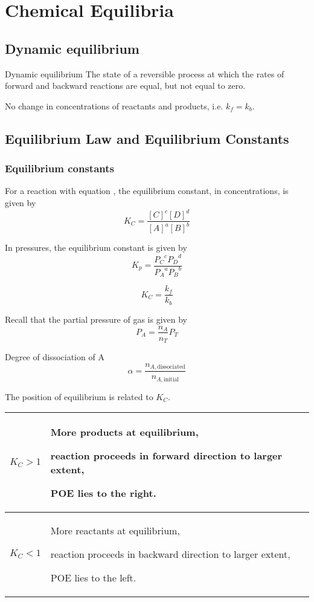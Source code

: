 \section{Chemical Equilibria}
\subsection{Dynamic equilibrium}
\begin{defn}{Dynamic equilibrium}{}
The state of a reversible process at which the rates of forward and backward reactions are equal, but not equal to zero.

No change in concentrations of reactants and products, i.e. $k_f=k_b$.
\end{defn}

\subsection{Equilibrium Law and Equilibrium Constants}

\subsubsection{Equilibrium constants}
For a reaction with equation , the equilibrium constant, in concentrations, is given by
\begin{equation}
K_C = \frac{[C]^c[D]^d}{[A]^a[B]^b}
\end{equation}

In pressures, the equilibrium constant is given by
\begin{equation}
K_p = \frac{{P_C}^c{P_D}^d}{{P_A}^a{P_B}^b}
\end{equation}

\begin{equation}
K_C=\frac{k_f}{k_b}
\end{equation}

Recall that the partial pressure of gas is given by
\begin{equation}
P_A=\frac{n_A}{n_T}P_T
\end{equation}

Degree of dissociation of A
\begin{equation}
\alpha=\frac{n_{A,\text{dissociated}}}{n_{A,\text{initial}}}
\end{equation}

The position of equilibrium is related to $K_C$.
\begin{table}[H]
\centering
\begin{tabular}{|p{2cm}|p{11cm}|}
\hline
$K_C>1$ & More products at equilibrium,

reaction proceeds in forward direction to larger extent,

POE lies to the right. \\
\hline
$K_C<1$ & More reactants at equilibrium,

reaction proceeds in backward direction to larger extent,

POE lies to the left. \\
\hline
\end{tabular}
\end{table}

